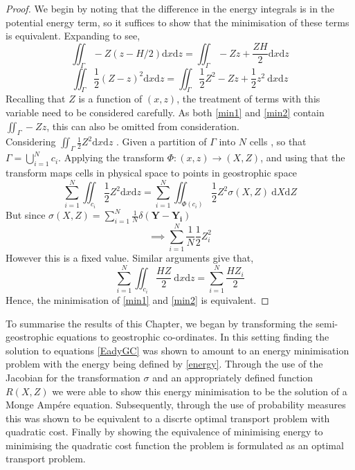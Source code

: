 \begin{proof}
	We begin by noting that the difference in the energy integrals is in the potential energy term, so it suffices to show that the minimisation of these terms is equivalent. Expanding to see,
	\begin{equation}
	\iint_{\Gamma} - Z\left(z - H/2\right)\textrm{d}x\textrm{d}z = \iint_{\Gamma} - Zz + \frac{ZH}{2}\textrm{d}x\textrm{d}z
	\label{min1}
	\end{equation} 
	\begin{equation}
	\iint_{\Gamma} \frac{1}{2}\left(Z - z\right)^2\textrm{d}x\textrm{d}z = \iint_{\Gamma} \frac{1}{2}Z^2 - Zz + \frac{1}{2} z^2 \ \textrm{d}x\textrm{d}z
	\label{min2}  
	\end{equation}
	Recalling that $Z$ is a function of $(x,z)$, the treatment of terms with this variable need to be considered carefully. As both \ref{min1} and \ref{min2} contain $\iint_{\Gamma} - Zz$, this can also be omitted from consideration.\\
	\linebreak
	Considering $\iint_{\Gamma} \frac{1}{2}Z^2\textrm{d}x\textrm{d}z$ . Given a partition of $\Gamma$ into $N$ cells , so that $\Gamma = \bigcup_{i=1}^N c_i$. Applying the transform $\Phi: (x,z) \rightarrow (X,Z)$, and using that the transform maps cells in physical space to points in geostrophic space
	\begin{equation*}
		\sum_{i=1}^N \iint_{c_i} \frac{1}{2}Z^2\textrm{d}x\textrm{d}z = \sum_{i=1}^N \iint_{\Phi(c_i)} \frac{1}{2}Z^2\sigma(X,Z) \ \textrm{d}X\textrm{d}Z 
	\end{equation*}
	But since $\sigma(X,Z) = \sum_{i=1}^{N} \frac{1}{N} \delta(\bm{Y}-\bm{Y_i})$
	\begin{equation*}
		\implies \sum_{i=1}^N \frac{1}{N} \frac{1}{2}Z_i^2
	\end{equation*}
	However this is a fixed value. Similar arguments give that,
	\begin{equation*}
		\sum_{i=1}^N \iint_{c_i} \frac{HZ}{2} \ \textrm{d}x\textrm{d}z = \sum_{i=1}^N \frac{HZ_i}{2}
	\end{equation*}
	Hence, the minimisation of \ref{min1} and \ref{min2} is equivalent.
\end{proof}
To summarise the results of this Chapter, we began by transforming the semi-geostrophic equations to geostrophic co-ordinates. In this setting finding the solution to equations \ref{EadyGC} was shown to amount to an energy minimisation problem with the energy being defined by \ref{energy}. Through the use of the Jacobian for the transformation $\sigma$ and an appropriately defined function $R(X,Z)$ we were able to show this energy minimisation to be the solution of a Monge Amp\'{e}re equation. Subsequently, through the use of probability measures this was shown to be equivalent to a discrte optimal transport problem with quadratic cost. Finally by showing the equivalence of minimising energy to minimising the quadratic cost function the problem is formulated as an optimal transport problem.

